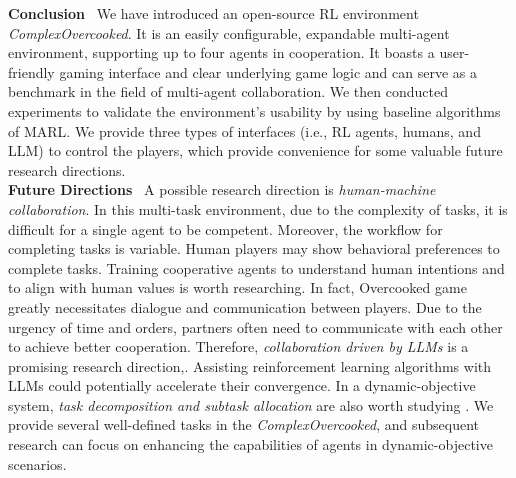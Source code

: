 \textbf{Conclusion} \ We have introduced an open-source RL environment \textit{ComplexOvercooked}. It is an easily configurable, expandable multi-agent environment, supporting up to four agents in cooperation. It boasts a user-friendly gaming interface and clear underlying game logic and can serve as a benchmark in the field of multi-agent collaboration. We then conducted experiments to validate the environment's usability by using baseline algorithms of MARL. We provide three types of interfaces (i.e., RL agents, humans, and LLM) to control the players, which provide convenience for some valuable future research directions.
\\
\textbf{Future Directions} \ A possible research direction is \textit{human-machine collaboration}. In this multi-task environment, due to the complexity of tasks, it is difficult for a single agent to be competent. Moreover, the workflow for completing tasks is variable. Human players may show behavioral preferences to complete tasks. Training cooperative agents to understand human intentions and to align with human values \cite{yuan2022situ} is worth researching. In fact, Overcooked game greatly necessitates dialogue and communication between players. Due to the urgency of time and orders, partners often need to communicate with each other to achieve better cooperation. Therefore, \textit{collaboration driven by LLMs} is a promising research direction\cite{wen2022multi,zhang2023proagent,zhu2023madiff},. Assisting reinforcement learning algorithms with LLMs could potentially accelerate their convergence. In a dynamic-objective system, \textit{task decomposition and subtask allocation} are also worth studying \cite{yang2022ldsa,iqbal2022alma}. We provide several well-defined tasks in the \textit{ComplexOvercooked}, and subsequent research can focus on enhancing the capabilities of agents in dynamic-objective scenarios.